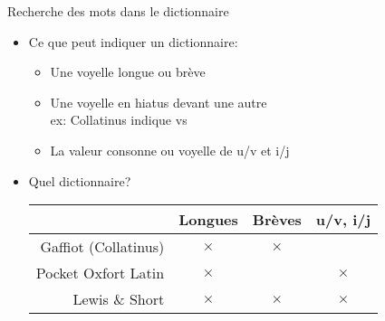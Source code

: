 \documentclass{beamer}
\newcommand{\latin}[1]{\structure{#1}}
\newcommand{\crx}{$\times$}
\begin{document}
\begin{frame}{Recherche des mots dans le dictionnaire}  %

\begin{itemize}


\item Ce que peut indiquer un dictionnaire:

\begin{itemize}
\item Une voyelle longue ou brève 
\item Une voyelle en hiatus devant une autre \\
ex: Collatinus indique \latin{m{\u e}us} vs \latin{seu}
\item La valeur consonne ou voyelle de u/v et i/j
\end{itemize}

\vfill

\item Quel dictionnaire?

\begin{tabular}{r c c c}
				& Longues & Brèves & u/v, i/j \\
\hline
Gaffiot (Collatinus)		& \crx    & \crx   &  \\
Pocket Oxfort Latin & \crx &       & \crx \\
Lewis \& Short	& \crx    & \crx   & \crx \\
\hline
\end{tabular}


\end{itemize}

\end{frame} %
\end{document}

